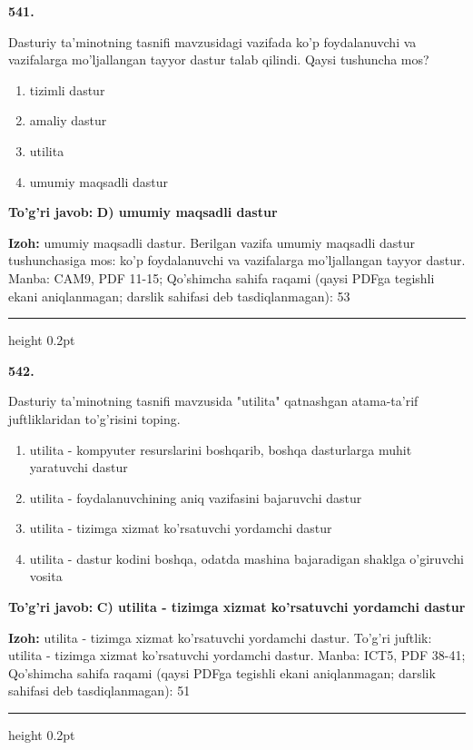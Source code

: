 \documentclass[10pt,a4paper]{article}
\begin{document}
{\bfseries\sffamily\color{ink} 541.}
\par
Dasturiy ta'minotning tasnifi mavzusidagi vazifada ko'p foydalanuvchi va vazifalarga mo'ljallangan tayyor dastur talab qilindi. Qaysi tushuncha mos?
\begin{enumerate}[label=\Alph*),leftmargin=9mm]
\item tizimli dastur
\item amaliy dastur
\item utilita
\item umumiy maqsadli dastur
\end{enumerate}
\begin{tcolorbox}[enhanced,breakable,colback=teal!4,colframe=teal!60!black,boxrule=0.45pt,arc=1.2mm,left=2.7mm,right=2.7mm,top=1.8mm,bottom=1.8mm,before skip=2mm,after skip=2mm]
{\bfseries\sffamily\color{teal}To'g'ri javob:} \textbf{D) umumiy maqsadli dastur}
\par\smallskip
{\bfseries Izoh:} umumiy maqsadli dastur. Berilgan vazifa umumiy maqsadli dastur tushunchasiga mos: ko'p foydalanuvchi va vazifalarga mo'ljallangan tayyor dastur. Manba: CAM9, PDF 11-15; Qo'shimcha sahifa raqami (qaysi PDFga tegishli ekani aniqlanmagan; darslik sahifasi deb tasdiqlanmagan): 53
\end{tcolorbox}
\vspace{2mm}\hrule height 0.2pt\vspace{3mm}

{\bfseries\sffamily\color{ink} 542.}
\par
Dasturiy ta'minotning tasnifi mavzusida "utilita" qatnashgan atama-ta'rif juftliklaridan to'g'risini toping.
\begin{enumerate}[label=\Alph*),leftmargin=9mm]
\item utilita - kompyuter resurslarini boshqarib, boshqa dasturlarga muhit yaratuvchi dastur
\item utilita - foydalanuvchining aniq vazifasini bajaruvchi dastur
\item utilita - tizimga xizmat ko'rsatuvchi yordamchi dastur
\item utilita - dastur kodini boshqa, odatda mashina bajaradigan shaklga o'giruvchi vosita
\end{enumerate}
\begin{tcolorbox}[enhanced,breakable,colback=teal!4,colframe=teal!60!black,boxrule=0.45pt,arc=1.2mm,left=2.7mm,right=2.7mm,top=1.8mm,bottom=1.8mm,before skip=2mm,after skip=2mm]
{\bfseries\sffamily\color{teal}To'g'ri javob:} \textbf{C) utilita - tizimga xizmat ko'rsatuvchi yordamchi dastur}
\par\smallskip
{\bfseries Izoh:} utilita - tizimga xizmat ko'rsatuvchi yordamchi dastur. To'g'ri juftlik: utilita - tizimga xizmat ko'rsatuvchi yordamchi dastur. Manba: ICT5, PDF 38-41; Qo'shimcha sahifa raqami (qaysi PDFga tegishli ekani aniqlanmagan; darslik sahifasi deb tasdiqlanmagan): 51
\end{tcolorbox}
\vspace{2mm}\hrule height 0.2pt\vspace{3mm}
\end{document}
